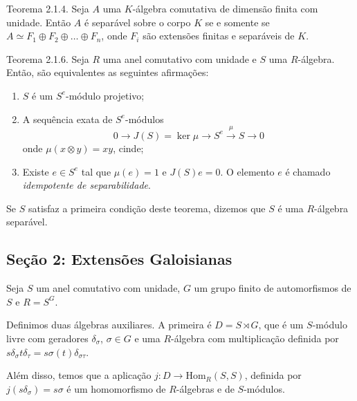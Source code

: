\documentclass{beamer}
\begin{document}
\begin{frame}{Teorema 2.1.4.}
    Seja $A$ uma $K$-álgebra comutativa de dimensão finita com unidade. Então $A$ é separável sobre o corpo $K$ se e somente se $A \simeq F_1 \oplus F_2 \oplus \dots \oplus F_n$, onde $F_i$ são extensões finitas e separáveis de $K$.
\end{frame}

\begin{frame}{Teorema 2.1.6.}
    Seja $R$ uma anel comutativo com unidade e $S$ uma $R$-álgebra. Então, são equivalentes as seguintes afirmações:
    \begin{enumerate}
        \item $S$ é um $S^e$-módulo projetivo;
        \item A sequência exata de $S^e$-módulos $$0 \rightarrow J(S)=\ker \mu \rightarrow S^e \xrightarrow{\mu} S \rightarrow 0$$onde $\mu(x\otimes y)=xy$, cinde;
        \item Existe $e \in S^e$ tal que $\mu(e)=1$ e $J(S)e=0$. O elemento $e$ é chamado \emph{idempotente de separabilidade}.
    \end{enumerate}
    
    \vspace{18pt}
    
    Se $S$ satisfaz a primeira condição deste teorema, dizemos que $S$ é uma $R$-álgebra separável.
\end{frame}


            \subsection{Seção 2: Extensões Galoisianas}
\begin{frame}
    Seja $S$ um anel comutativo com unidade, $G$ um grupo finito de automorfismos de $S$ e $R = S^G$.
    
    \vspace{18pt}
    
    Definimos duas álgebras auxiliares. A primeira é $D = S \rtimes G$, que é um $S$-módulo livre com geradores $\delta_\sigma$, $\sigma \in G$ e uma $R$-álgebra com multiplicação definida por $s \delta_\sigma t \delta_\tau = s \sigma(t) \delta_{\sigma\tau}$.
    
    \vspace{18pt}
    
    Além disso, temos que a aplicação $j: D \rightarrow \text{Hom}_R(S,S)$, definida por $j(s \delta_\sigma) = s\sigma$ é um homomorfismo de $R$-álgebras e de $S$-módulos.
\end{frame}
\end{document}
